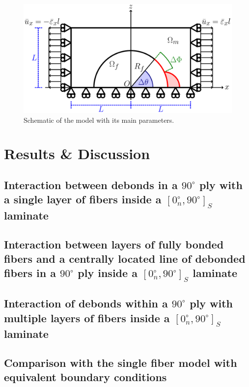 \documentclass[review]{elsarticle}
\begin{document}
\begin{figure}[!h]
\centering
        \includegraphics[width=\textwidth]{RUC.pdf}
\caption{Schematic of the model with its main parameters.}\label{fig:modelschem}
\end{figure}


\section{Results \& Discussion}

\subsection{Interaction between debonds in a $90^{\circ}$ ply with a single layer of fibers inside a $\left[0^{\circ}_{n}, 90^{\circ}\right]_{S}$ laminate}


\subsection{Interaction between layers of fully bonded fibers and a centrally located line of debonded fibers in a $90^{\circ}$ ply inside a $\left[0^{\circ}_{n}, 90^{\circ}\right]_{S}$ laminate}



\subsection{Interaction of debonds within a $90^{\circ}$ ply with multiple layers of fibers inside a $\left[0^{\circ}_{n}, 90^{\circ}\right]_{S}$ laminate}

\subsection{Comparison with the single fiber model with equivalent boundary conditions}\label{subsec:eqBC}
\end{document}

